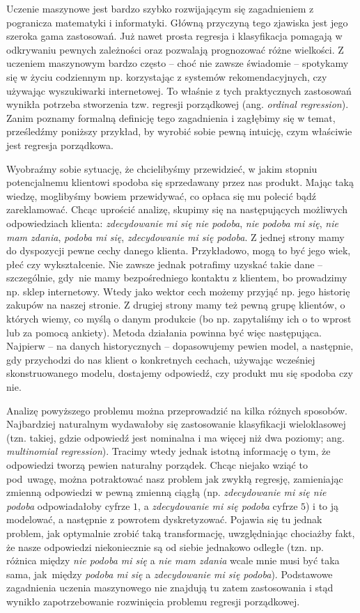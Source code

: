 \documentclass{mini}
\begin{document}
Uczenie maszynowe jest bardzo szybko rozwijającym się zagadnieniem z pogranicza matematyki i informatyki. Główną przyczyną tego zjawiska jest jego szeroka gama zastosowań. Już nawet prosta regresja i klasyfikacja pomagają w odkrywaniu pewnych zależności oraz pozwalają prognozować różne wielkości. Z uczeniem maszynowym bardzo często -- choć nie zawsze świadomie -- spotykamy się w życiu codziennym np. korzystając z systemów rekomendacyjnych, czy używając wyszukiwarki internetowej. To właśnie z tych praktycznych zastosowań wynikła potrzeba stworzenia tzw. regresji porządkowej (ang. \textit{ordinal regression}). Zanim poznamy formalną definicję tego zagadnienia i zagłębimy się w temat, prześledźmy poniższy przykład, by wyrobić sobie pewną intuicję, czym właściwie jest regresja porządkowa.  

Wyobraźmy sobie sytuację, że chcielibyśmy przewidzieć, w jakim stopniu potencjalnemu klientowi spodoba się sprzedawany przez nas produkt. Mając taką wiedzę, moglibyśmy bowiem przewidywać, co opłaca się mu polecić bądź zareklamować. Chcąc uprościć analizę, skupimy się na następujących możliwych odpowiedziach klienta: \textit{zdecydowanie mi się nie podoba}, \textit{nie podoba mi się}, \textit{nie mam zdania}, \textit{podoba mi się}, \textit{zdecydowanie mi się podoba}. Z jednej strony mamy do dyspozycji pewne cechy danego klienta. Przykładowo, mogą to być jego wiek, płeć czy wykształcenie. Nie zawsze jednak potrafimy uzyskać takie dane -- szczególnie, gdy~nie mamy bezpośredniego kontaktu z klientem, bo prowadzimy np. sklep internetowy. Wtedy jako wektor cech możemy przyjąć np. jego historię zakupów na naszej stronie. Z drugiej strony mamy też pewną grupę klientów, o których wiemy, co myślą o danym produkcie (bo np. zapytaliśmy ich o to wprost lub za pomocą ankiety). Metoda działania powinna być więc następująca. Najpierw -- na danych historycznych -- dopasowujemy pewien model, a następnie, gdy przychodzi do nas klient o konkretnych cechach, używając wcześniej skonstruowanego modelu, dostajemy odpowiedź, czy produkt mu się spodoba czy nie. 

Analizę powyższego problemu można przeprowadzić na kilka różnych sposobów. Najbardziej naturalnym wydawałoby się zastosowanie klasyfikacji wieloklasowej (tzn. takiej, gdzie odpowiedź jest nominalna i ma więcej niż dwa poziomy; ang. \textit{multinomial regression}). Tracimy wtedy jednak istotną informację o tym, że odpowiedzi tworzą pewien naturalny porządek. Chcąc niejako wziąć to pod~uwagę, można potraktować nasz problem jak zwykłą regresję, zamieniając zmienną odpowiedzi w pewną zmienną ciągłą (np. \textit{zdecydowanie mi się nie podoba} odpowiadałoby cyfrze $1$, a \textit{zdecydowanie mi się podoba} cyfrze $5$) i to ją modelować, a następnie z powrotem dyskretyzować. Pojawia się tu jednak problem, jak optymalnie zrobić taką transformację, uwzględniając chociażby fakt, że nasze odpowiedzi niekoniecznie są od siebie jednakowo odległe (tzn. np. różnica między \textit{nie podoba mi się} a \textit{nie mam zdania} wcale mnie musi być taka sama, jak~między \textit{podoba mi się} a \textit{zdecydowanie mi się podoba}). Podstawowe zagadnienia uczenia maszynowego nie znajdują tu zatem zastosowania i stąd wynikło zapotrzebowanie rozwinięcia problemu regresji porządkowej. 
\end{document}
